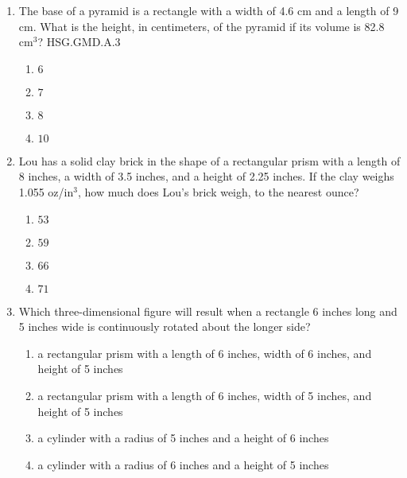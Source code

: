 \documentclass[12pt, twoside]{article}
\begin{document}
\begin{enumerate}
\item The base of a pyramid is a rectangle with a width of 4.6 cm and a length of 9 cm. What is the height, in centimeters, of the pyramid if its volume is 82.8 cm$^3$? \hfill HSG.GMD.A.3
\begin{multicols}{2}
  \begin{enumerate}
    \item $6$
    \item $7$
    \item $8$
    \item $10$
  \end{enumerate}
  \end{multicols} \vspace{0.5cm}

\item Lou has a solid clay brick in the shape of a rectangular prism with a length of 8 inches, a width of 3.5 inches, and a height of 2.25 inches. If the clay weighs 1.055 oz/in$^3$, how much does Lou's brick weigh, to the nearest ounce? 
\begin{multicols}{2}
  \begin{enumerate}
  \item $53$
  \item $59$
  \item $66$
  \item $71$
\end{enumerate}
\end{multicols} \vspace{2.5cm}

\newpage
\item Which three-dimensional figure will result when a rectangle 6 inches long and 5 inches wide is continuously rotated about the longer side?
\begin{enumerate}
  \item a rectangular prism with a length of 6 inches, width of 6 inches, and height of 5 inches
  \item a rectangular prism with a length of 6 inches, width of 5 inches, and height of 5 inches
  \item a cylinder with a radius of 5 inches and a height of 6 inches
  \item a cylinder with a radius of 6 inches and a height of 5 inches
\end{enumerate}


\end{enumerate}
\end{document}
